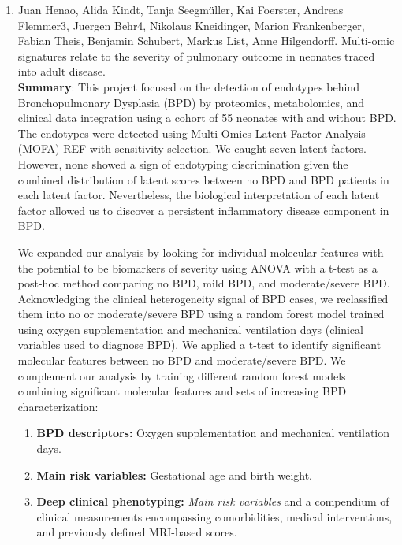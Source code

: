 \begin{enumerate}
	\item Juan Henao, Alida Kindt, Tanja Seegmüller, Kai Foerster, Andreas Flemmer3, Juergen Behr4, Nikolaus Kneidinger, Marion Frankenberger, Fabian Theis, Benjamin Schubert, Markus List, Anne Hilgendorff. Multi-omic signatures relate to the severity of pulmonary outcome in neonates traced into adult disease.\\
	
	\textbf{Summary}: This project focused on the detection of endotypes behind Bronchopulmonary Dysplasia (BPD) by proteomics, metabolomics, and clinical data integration using a cohort of 55 neonates with and without BPD. The endotypes were detected using Multi-Omics Latent Factor Analysis (MOFA) REF with sensitivity selection. We caught seven latent factors. However, none showed a sign of endotyping discrimination given the combined distribution of latent scores between no BPD and BPD patients in each latent factor. Nevertheless, the biological interpretation of each latent factor allowed us to discover a persistent inflammatory disease component in BPD.

We expanded our analysis by looking for individual molecular features with the potential to be biomarkers of severity using ANOVA with a t-test as a post-hoc method comparing no BPD, mild BPD, and moderate/severe BPD. Acknowledging the clinical heterogeneity signal of BPD cases, we reclassified them into no or moderate/severe BPD using a random forest model trained using oxygen supplementation and mechanical ventilation days (clinical variables used to diagnose BPD). We applied a t-test to identify significant molecular features between no BPD and moderate/severe BPD. We complement our analysis by training different random forest models combining significant molecular features and sets of increasing BPD characterization:

	\begin{enumerate}
		\item \textbf{BPD descriptors:} Oxygen supplementation and mechanical ventilation days.
		\item \textbf{Main risk variables:} Gestational age and birth weight.
		\item \textbf{Deep clinical phenotyping:} \textit{Main risk variables} and a compendium of clinical measurements encompassing comorbidities, medical interventions, and previously defined MRI-based scores.
	\end{enumerate}


\end{enumerate}
